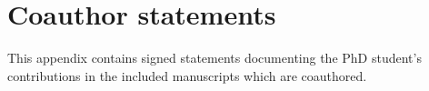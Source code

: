 \chapter{Coauthor statements}
\label{sec:appendix_coauthor_statements}

\bigskip
This appendix contains signed statements documenting the PhD student's contributions in the included manuscripts which are coauthored.







